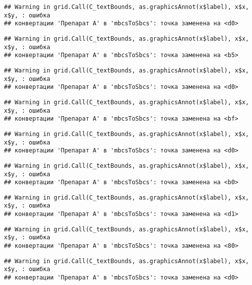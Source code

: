 \documentclass[
]{article}
\begin{document}
\begin{verbatim}
## Warning in grid.Call(C_textBounds, as.graphicsAnnot(x$label), x$x, x$y, : ошибка
## конвертации 'Препарат A' в 'mbcsToSbcs': точка заменена на <d0>
\end{verbatim}

\begin{verbatim}
## Warning in grid.Call(C_textBounds, as.graphicsAnnot(x$label), x$x, x$y, : ошибка
## конвертации 'Препарат A' в 'mbcsToSbcs': точка заменена на <b5>
\end{verbatim}

\begin{verbatim}
## Warning in grid.Call(C_textBounds, as.graphicsAnnot(x$label), x$x, x$y, : ошибка
## конвертации 'Препарат A' в 'mbcsToSbcs': точка заменена на <d0>
\end{verbatim}

\begin{verbatim}
## Warning in grid.Call(C_textBounds, as.graphicsAnnot(x$label), x$x, x$y, : ошибка
## конвертации 'Препарат A' в 'mbcsToSbcs': точка заменена на <bf>
\end{verbatim}

\begin{verbatim}
## Warning in grid.Call(C_textBounds, as.graphicsAnnot(x$label), x$x, x$y, : ошибка
## конвертации 'Препарат A' в 'mbcsToSbcs': точка заменена на <d0>
\end{verbatim}

\begin{verbatim}
## Warning in grid.Call(C_textBounds, as.graphicsAnnot(x$label), x$x, x$y, : ошибка
## конвертации 'Препарат A' в 'mbcsToSbcs': точка заменена на <b0>
\end{verbatim}

\begin{verbatim}
## Warning in grid.Call(C_textBounds, as.graphicsAnnot(x$label), x$x, x$y, : ошибка
## конвертации 'Препарат A' в 'mbcsToSbcs': точка заменена на <d1>
\end{verbatim}

\begin{verbatim}
## Warning in grid.Call(C_textBounds, as.graphicsAnnot(x$label), x$x, x$y, : ошибка
## конвертации 'Препарат A' в 'mbcsToSbcs': точка заменена на <80>
\end{verbatim}

\begin{verbatim}
## Warning in grid.Call(C_textBounds, as.graphicsAnnot(x$label), x$x, x$y, : ошибка
## конвертации 'Препарат A' в 'mbcsToSbcs': точка заменена на <d0>
\end{verbatim}
\end{document}
